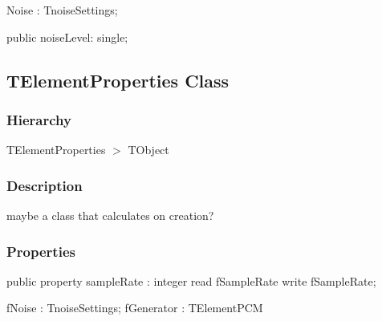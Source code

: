 \documentclass{report}
\newif\ifpdf
\begin{document}
\begin{list}{}
\begin{flushleft}
\ifpdf
\end{flushleft}
\fi


\par Noise : TnoiseSettings;\label{morse.pcm.Util.TElementSettings-noiseLevel}
\item[\textbf{noiseLevel}\hfill]
\ifpdf
\begin{flushleft}
\fi
\begin{ttfamily}
public noiseLevel: single;\end{ttfamily}

\ifpdf
\end{flushleft}
\fi


\par  \end{list}
\ifpdf
\subsection*{\large{\textbf{TElementProperties Class}}\normalsize\hspace{1ex}\hrulefill}
\else
\subsection*{TElementProperties Class}
\fi
\label{morse.pcm.Util.TElementProperties}
\subsubsection*{\large{\textbf{Hierarchy}}\normalsize\hspace{1ex}\hfill}
TElementProperties {$>$} TObject
\subsubsection*{\large{\textbf{Description}}\normalsize\hspace{1ex}\hfill}
maybe a class that calculates on creation?\subsubsection*{\large{\textbf{Properties}}\normalsize\hspace{1ex}\hfill}
\begin{list}{}{
\setlength{\itemindent}{0cm}
\setlength{\listparindent}{0cm}
\setlength{\leftmargin}{\evensidemargin}
\addtolength{\leftmargin}{\tmplength}
\settowidth{\labelsep}{X}
\addtolength{\leftmargin}{\labelsep}
\setlength{\labelwidth}{\tmplength}
}
\label{morse.pcm.Util.TElementProperties-sampleRate}
\item[\textbf{sampleRate}\hfill]
\ifpdf
\begin{flushleft}
\fi
\begin{ttfamily}
public property sampleRate : integer read fSampleRate write fSampleRate;\end{ttfamily}

\ifpdf
\end{flushleft}
\fi


\par fNoise : TnoiseSettings; fGenerator : TElementPCM\end{list}
\ifpdf
\end{document}
